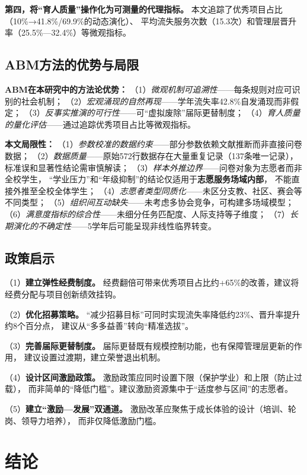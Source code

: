 \documentclass[12pt,a4paper]{article}
\begin{document}
\textbf{第四，将“育人质量”操作化为可测量的代理指标。}
本文追踪了优秀项目占比（10\%→41.8\%/69.9\%的动态演化）、
平均流失服务次数（15.3次）和管理层晋升率（25.5\%—32.4\%）等微观指标。

\subsection{ABM方法的优势与局限}

\textbf{ABM在本研究中的方法论优势：}
（1）\textit{微观机制可追溯性}——每条规则对应可识别的社会机制；
（2）\textit{宏观涌现的自然再现}——学年流失率42.8\%自发涌现而非假定；
（3）\textit{反事实推演的可行性}——可“虚拟废除”届际更替制度；
（4）\textit{育人质量的量化评估}——通过追踪优秀项目占比等微观指标。

\textbf{本文局限性：}
（1）\textit{参数校准的数据约束}——部分参数依赖文献推断而非直接问卷数据；
（2）\textit{数据质量}——原始572行数据存在大量重复记录（137条唯一记录），
标准误和显著性结论需审慎解读；
（3）\textit{样本外推边界}——问卷对象为志愿者而非全校学生，
“学业压力”和“年级抑制”的结论仅适用于\textbf{志愿服务场域内部}，
不能直接外推至全校全体学生；
（4）\textit{志愿者类型同质化}——未区分支教、社区、赛会等不同类型；
（5）\textit{组织间互动缺失}——未考虑多协会竞争，可构建多场域模型；
（6）\textit{满意度指标的综合性}——未细分任务匹配度、人际支持等子维度；
（7）\textit{长期演化的不确定性}——5学年后可能呈现非线性临界转变。

\subsection{政策启示}

（1）\textbf{建立弹性经费制度。}
经费翻倍可带来优秀项目占比约+65\%的改善，建议将经费分配与项目创新绩效挂钩。

（2）\textbf{优化招募策略。}
“减少招募目标”可同时实现流失率降低约23\%、晋升率提升约8个百分点，
建议从“多多益善”转向“精准选拔”。

（3）\textbf{完善届际更替制度。}
届际更替既有规模控制功能，也有保障管理层更新的作用，
建议设置过渡期，建立荣誉退出机制。

（4）\textbf{设计区间激励政策。}
激励政策应同时设置下限（保护学业）和上限（防止过载），
而非简单的“降低门槛”。建议激励资源集中于“适度参与区间”的志愿者。

（5）\textbf{建立“激励—发展”双通道。}
激励改革应聚焦于成长体验的设计（培训、轮岗、领导力培养），
而非仅降低激励门槛。

\section{结论}
\end{document}
